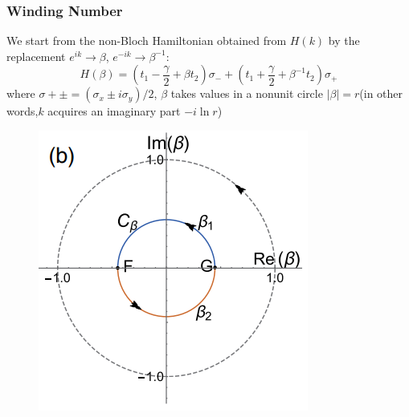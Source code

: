 \documentclass{beamer}
\begin{document}
  \begin{frame}
    \frametitle{Winding Number}
    We start from the non-Bloch Hamiltonian obtained from $H(k)$ by the replacement $e^{ik}\rightarrow \beta$, $e^{-ik}\rightarrow \beta^{-1}$:
    \begin{equation}
    H(\beta)=(t_1-\frac{\gamma}{2}+\beta t_2)\sigma_{-}+(t_1+\frac{\gamma}{2}+\beta^{-1}t_2)\sigma_{+}
    \end{equation}
    where $\sigma+{\pm}=(\sigma_x\pm i\sigma_y)/2$, $\beta$ takes values in a nonunit circle $|\beta|=r$(in other words,$k$ acquires an imaginary part $-i\ln r$)
    \begin{figure}
    \includegraphics[scale=0.5]{figure/gbz.png}
    \end{figure}
    
  \end{frame}
\end{document}
